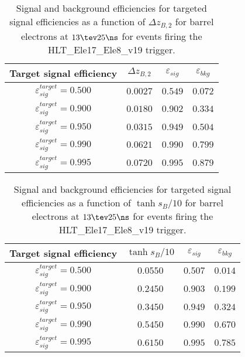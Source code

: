 \clearpage

\begin{table}[!bht]
  \begin{center}
    \begin{tabular}{cccc}
      \hline
      Target signal efficiency & $\Delta z_{B,2}$ & $\varepsilon_{sig}$ & $\varepsilon_{bkg}$ \\ 
      \hline
      $\varepsilon_{sig}^{target} = 0.500$ & $  0.0027$ & $0.549$ & $0.072$ \\
      $\varepsilon_{sig}^{target} = 0.900$ & $  0.0180$ & $0.902$ & $0.334$ \\
      $\varepsilon_{sig}^{target} = 0.950$ & $  0.0315$ & $0.949$ & $0.504$ \\
      $\varepsilon_{sig}^{target} = 0.990$ & $  0.0621$ & $0.990$ & $0.799$ \\
      $\varepsilon_{sig}^{target} = 0.995$ & $  0.0720$ & $0.995$ & $0.879$ \\
      \hline
    \end{tabular}
    \caption{Signal and background efficiencies for targeted signal efficiencies as a function of $\Delta z_{B,2}$ for barrel electrons at $13\tev 25\ns$ for events firing the HLT\_Ele17\_Ele8\_v19 trigger.}
    \label{tab:eff_rej_z2B_beam_13_25_trigger_17_8_B}
  \end{center}
\end{table}

\clearpage

\begin{table}[!bht]
  \begin{center}
    \begin{tabular}{cccc}
      \hline
      Target signal efficiency & $\tanh{s_B/10}$ & $\varepsilon_{sig}$ & $\varepsilon_{bkg}$ \\ 
      \hline
      $\varepsilon_{sig}^{target} = 0.500$ & $  0.0550$ & $0.507$ & $0.014$ \\
      $\varepsilon_{sig}^{target} = 0.900$ & $  0.2450$ & $0.903$ & $0.199$ \\
      $\varepsilon_{sig}^{target} = 0.950$ & $  0.3450$ & $0.949$ & $0.324$ \\
      $\varepsilon_{sig}^{target} = 0.990$ & $  0.5450$ & $0.990$ & $0.670$ \\
      $\varepsilon_{sig}^{target} = 0.995$ & $  0.6150$ & $0.995$ & $0.785$ \\
      \hline
    \end{tabular}
    \caption{Signal and background efficiencies for targeted signal efficiencies as a function of $\tanh{s_B/10}$ for barrel electrons at $13\tev 25\ns$ for events firing the HLT\_Ele17\_Ele8\_v19 trigger.}
    \label{tab:eff_rej_sB_beam_13_25_trigger_17_8_B}
  \end{center}
\end{table}

